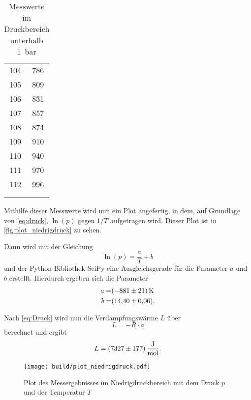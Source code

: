 \begin{table}
\begin{tabular}{S[table-format=3.0] S[table-format=3.0]}
        104 & 786 \\
        105 & 809 \\
        106 & 831 \\
        107 & 857 \\
        108 & 874 \\
        109 & 910 \\
        110 & 940 \\
        111 & 970 \\
        112 & 996 \\
        & \\
        & \\
        \bottomrule
    \end{tabular}
    \caption{Messwerte im Druckbereich unterhalb \SI{1}{bar}}
    \label{tab:niedrigdruck_messwerte}
\end{table}

Mithilfe dieser Messwerte wird nun ein Plot angefertig, in dem, auf Grundlage von \autoref{eq:druck}, $\ln(p)$ gegen $1/T$ aufgetragen wird.
Dieser Plot ist in \autoref{fig:plot_niedrigdruck} zu sehen.

Dann wird mit der Gleichung
\begin{equation}
    \ln(p) = \frac{a}{T} + b
\end{equation}
und der Python Bibliothek SciPy eine Ausgleichsgerade für die Parameter $a$ und $b$ erstellt.\cite{scipy} Hierdurch ergeben sich die Parameter
\begin{align*}
    a =& \SI{-881+-21}{\kelvin} \\
    b =& \SI{14.40+-0.06}{}.
    \label{eq:niedrigdruck_parameter}
\end{align*}

Nach \autoref{eq:Druck} wird nun die Verdampfungswärme $L$ über
\begin{equation}
    L = -R \cdot a
\end{equation}
berechnet und ergibt
\begin{equation*}
    L = \SI{7327+-177}{\joule\per\mol}.
\end{equation*}

\begin{figure}
    \centering
    \texttt{[image: build/plot\_niedrigdruck.pdf]}
    \caption{Plot des Messergebnisses im Niedrigdruckbereich mit dem Druck $p$ und der Temperatur $T$}
    \label{fig:plot_niedrigdruck}
\end{figure}

